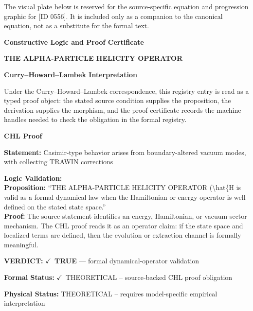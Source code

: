 \begingroup\footnotesize\sloppy
The visual plate below is reserved for the source-specific equation and progression graphic for [ID 0556]. It is included only as a companion to the canonical equation, not as a substitute for the formal text.
\par\endgroup
\ifTZPDarkEdition
{}
\fi

\clearpage
\begingroup\tzpsupportsetup
\noindent\textbf{\fontsize{10.8pt}{12.8pt}\selectfont [ID 0556] Constructive Logic and Proof Certificate}\par
\noindent\textbf{\fontsize{10pt}{12pt}\selectfont THE ALPHA-PARTICLE HELICITY OPERATOR}\par
\vspace{0.45em}
\begingroup
\footnotesize
\setlength{\parskip}{0.22em}
\setlength{\parindent}{0pt}
\noindent\textbf{Curry--Howard--Lambek Interpretation}\par
Under the Curry--Howard--Lambek correspondence, this registry entry is read as a typed proof
object: the stated source condition supplies the proposition, the derivation supplies the
morphism, and the proof certificate records the machine handles needed to check the obligation
in the formal registry.

\vspace{0.45em}
\noindent\textbf{CHL Proof}\par
\textbf{Statement:} Casimir-type behavior arises from boundary-altered vacuum modes, with  collecting
TRAWIN corrections

\textbf{Logic Validation:}\\
\textbf{Proposition:} ``THE ALPHA-PARTICLE HELICITY OPERATOR (\textbackslash{}hat\{H is valid as a formal dynamical law when
the Hamiltonian or energy operator is well defined on the stated state space.''\\
\textbf{Proof:} The source statement identifies an energy, Hamiltonian, or vacuum-sector mechanism. The
CHL proof reads it as an operator claim: if the state space and localized terms are
defined, then the evolution or extraction channel is formally meaningful.

\textbf{VERDICT:} \ensuremath{\checkmark}\ \textbf{TRUE} --- formal dynamical-operator validation

\textbf{Formal Status:} \ensuremath{\checkmark}\ THEORETICAL -- source-backed CHL proof obligation

\textbf{Physical Status:} THEORETICAL -- requires model-specific empirical interpretation
\par\vspace{0.45em}
\par
\ifTZPDarkEdition
{}
\fi
\endgroup
\endgroup
